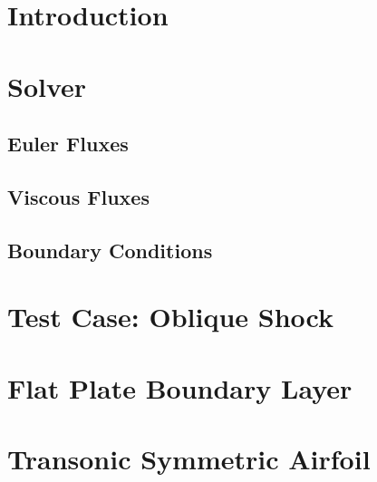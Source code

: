 \documentclass{article}
\begin{document}



\section{Introduction}

\section{Solver}

\subsection{Euler Fluxes}

\subsection{Viscous Fluxes}

\subsection{Boundary Conditions}

\section{Test Case: Oblique Shock}

\section{Flat Plate Boundary Layer}

\section{Transonic Symmetric Airfoil}
\end{document}
